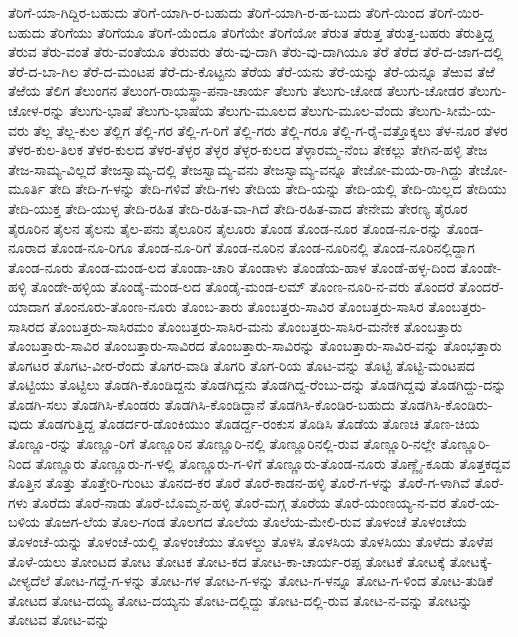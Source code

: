 ತೆರಿಗೆ-ಯಾ-ಗಿದ್ದಿರ-ಬಹುದು
ತೆರಿಗೆ-ಯಾಗಿ-ರ-ಬಹುದು
ತೆರಿಗೆ-ಯಾಗಿ-ರ-ಹ-ಬುದು
ತೆರಿಗೆ-ಯಿಂದ
ತೆರಿಗೆ-ಯಿರ-ಬಹುದು
ತೆರಿಗೆಯು
ತೆರಿಗೆಯೂ
ತೆರಿಗೆ-ಯೆಂದೂ
ತೆರಿಗೆಯೇ
ತೆರಿಗೆಯೋ
ತೆರುತ
ತೆರುತ್ತ
ತೆರುತ್ತ-ಬಹರು
ತೆರುತ್ತಿದ್ದ
ತೆರುವ
ತೆರು-ವಂತೆ
ತೆರು-ವಂತೆಯೂ
ತೆರುವರು
ತೆರು-ವು-ದಾಗಿ
ತೆರು-ವು-ದಾಗಿಯೂ
ತೆರೆ
ತೆರೆದ
ತೆರೆ-ದ-ಜಾಗ-ದಲ್ಲಿ
ತೆರೆ-ದ-ಬಾ-ಗಿಲ
ತೆರೆ-ದ-ಮಂಟಪ
ತೆರೆ-ದು-ಕೊಟ್ಟನು
ತೆರೆಯ
ತೆರೆ-ಯನು
ತೆರೆ-ಯನ್ನು
ತೆರೆ-ಯನ್ನೂ
ತೆಱುವ
ತೆಱೆ
ತೆಱೆಯ
ತೆಲಿಗ
ತೆಲುಂಗನ
ತೆಲುಂಗ-ರಾಯಸ್ಥಾ-ಪನಾ-ಚಾರ್ಯ
ತೆಲುಗು
ತೆಲುಗು-ಚೋಡ
ತೆಲುಗು-ಚೋಡರ
ತೆಲುಗು-ಚೋಳ-ರನ್ನು
ತೆಲುಗು-ಭಾಷೆ
ತೆಲುಗು-ಭಾಷೆಯ
ತೆಲುಗು-ಮೂಲದ
ತೆಲುಗು-ಮೂಲ-ವೆಂದು
ತೆಲುಗು-ಸೀಮೆ-ಯ-ವರು
ತೆಲ್ಲ
ತೆಲ್ಲ-ಕುಲ
ತೆಲ್ಲಿಗ
ತೆಲ್ಲಿ-ಗರ
ತೆಲ್ಲಿ-ಗ-ರಿಗೆ
ತೆಲ್ಲಿ-ಗರು
ತೆಲ್ಲಿ-ಗರೂ
ತೆಲ್ಲಿ-ಗ-ರೈ-ವತ್ತೊಕ್ಕಲು
ತೆಳ-ನೂರ
ತೆಳರ
ತೆಳರ-ಕುಲ-ತಿಲಕ
ತೆಳರ-ಕುಲದ
ತೆಳರ-ತೆಳ್ಳರ
ತೆಳ್ಳರ
ತೆಳ್ಳರ-ಕುಲದ
ತೆಳ್ಳಾರಮ್ಮ-ನೆಂಬ
ತೇಕಲ್ಲು
ತೇಗಿನ-ಹಳ್ಳಿ
ತೇಜ
ತೇಜ-ಸಾಮ್ಯ-ವಿಲ್ಲದೆ
ತೇಜಸ್ವಾಮ್ಯ-ದಲ್ಲಿ
ತೇಜಸ್ವಾಮ್ಯ-ವನು
ತೇಜಸ್ವಾಮ್ಯ-ವನ್ನೂ
ತೇಜೋ-ಮಯ-ರಾ-ಗಿದ್ದು
ತೇಜೋ-ಮೂರ್ತಿ
ತೇದಿ
ತೇದಿ-ಗ-ಳನ್ನು
ತೇದಿ-ಗಳಿವೆ
ತೇದಿ-ಗಳು
ತೇದಿಯ
ತೇದಿ-ಯನ್ನು
ತೇದಿ-ಯಲ್ಲಿ
ತೇದಿ-ಯಿಲ್ಲದ
ತೇದಿಯು
ತೇದಿ-ಯುಕ್ತ
ತೇದಿ-ಯುಳ್ಳ
ತೇದಿ-ರಹಿತ
ತೇದಿ-ರಹಿತ-ವಾ-ಗಿದೆ
ತೇದಿ-ರಹಿತ-ವಾದ
ತೇನೇಮ
ತೇರಣ್ಯ
ತೈರೂರ
ತೈರೂರಿನ
ತೈಲನ
ತೈಲನು
ತೈಲ-ಪನು
ತೈಲೂರಿನ
ತೈಲೂರು
ತೊಂಡ
ತೊಂಡ-ನೂರ
ತೊಂಡ-ನೂ-ರನ್ನು
ತೊಂಡ-ನೂರಾದ
ತೊಂಡ-ನೂ-ರಿಗೂ
ತೊಂಡ-ನೂ-ರಿಗೆ
ತೊಂಡ-ನೂರಿನ
ತೊಂಡ-ನೂರಿನಲ್ಲಿ
ತೊಂಡ-ನೂರಿನಲ್ಲಿದ್ದಾಗ
ತೊಂಡ-ನೂರು
ತೊಂಡ-ಮಂಡ-ಲದ
ತೊಂಡಾ-ಚಾರಿ
ತೊಂಡಾಳು
ತೊಂಡೆಯ-ಹಾಳ
ತೊಂಡೆ-ಹಳ್ಳ-ದಿಂದ
ತೊಂಡೇ-ಹಳ್ಳಿ
ತೊಂಡೇ-ಹಳ್ಳಿಯ
ತೊಂಡೈ-ಮಂಡ-ಲದ
ತೊಂಡೈ-ಮಂಡ-ಲಮ್
ತೊಂಣ-ನೂರಿ-ನ-ವರು
ತೊಂದರೆ
ತೊಂದರೆ-ಯಾದಾಗ
ತೊಂನೂರು-ತೊಂಣ-ನೂರು
ತೊಂಬ-ತಾರು
ತೊಂಬತ್ತರು-ಸಾವಿರ
ತೊಂಬತ್ತರು-ಸಾಸಿರ
ತೊಂಬತ್ತರು-ಸಾಸಿರದ
ತೊಂಬತ್ತರು-ಸಾಸಿರಮಂ
ತೊಂಬತ್ತರು-ಸಾಸಿರ-ಮನು
ತೊಂಬತ್ತರು-ಸಾಸಿರ-ಮನೇಕ
ತೊಂಬತ್ತಾರು
ತೊಂಬತ್ತಾರು-ಸಾವಿರ
ತೊಂಬತ್ತಾರು-ಸಾವಿರದ
ತೊಂಬತ್ತಾರು-ಸಾವಿರನ್ನು
ತೊಂಬತ್ತಾರು-ಸಾವಿರ-ವನ್ನು
ತೊಂಭತ್ತಾರು
ತೊಗಟರ
ತೊಗಟ-ವೀರ-ರೆಂದು
ತೊಗರ-ವಾಡಿ
ತೊಗರಿ
ತೊಗ-ರಿಯ
ತೊಟ-ವನ್ನು
ತೊಟ್ಟಿ
ತೊಟ್ಟಿ-ಮಂಟಪದ
ತೊಟ್ಟಿಯು
ತೊಟ್ಟಿಲು
ತೊಡಗಿ-ಕೊಂಡಿದ್ದನು
ತೊಡಗಿದ್ದನು
ತೊಡಗಿದ್ದ-ರೆಂಬು-ದನ್ನು
ತೊಡಗಿದ್ದವು
ತೊಡಗಿದ್ದು-ದನ್ನು
ತೊಡಗಿ-ಸಲು
ತೊಡಗಿಸಿ-ಕೊಂಡರು
ತೊಡಗಿಸಿ-ಕೊಂಡಿದ್ದಾನೆ
ತೊಡಗಿಸಿ-ಕೊಂಡಿರ-ಬಹುದು
ತೊಡಗಿಸಿ-ಕೊಂಡಿರು-ವುದು
ತೊಡಗುತ್ತಿದ್ದ
ತೊಡರ್ದರ-ಡೊಂಕಿಯುಂ
ತೊಡರ್ದ್ದ-ರಂಕುಸ
ತೊಡಿಸಿ
ತೊಡೆಯ
ತೊಣಚಿ
ತೊಣ-ಚಿಯ
ತೊಣ್ಣೂ-ರನ್ನು
ತೊಣ್ಣೂ-ರಿಗೆ
ತೊಣ್ಣೂರಿನ
ತೊಣ್ಣೂರಿ-ನಲ್ಲಿ
ತೊಣ್ಣೂರಿನಲ್ಲಿ-ರುವ
ತೊಣ್ಣೂರಿ-ನಲ್ಲೇ
ತೊಣ್ಣೂರಿ-ನಿಂದ
ತೊಣ್ಣೂರು
ತೊಣ್ಣೂರು-ಗ-ಳಲ್ಲಿ
ತೊಣ್ಣೂರು-ಗ-ಳಿಗೆ
ತೊಣ್ಣೂರು-ತೊಂಡ-ನೂರು
ತೊಣ್ಣೈ-ಕೂಡು
ತೊತ್ತಕದ್ದವ
ತೊತ್ತಿನ
ತೊತ್ತು
ತೊತ್ತೇರಿ-ಗುಂಟು
ತೊನದ-ಕರ
ತೊರೆ
ತೊರೆ-ಕಾಡನ-ಹಳ್ಳಿ
ತೊರೆ-ಗ-ಳನ್ನು
ತೊರೆ-ಗ-ಳಾಗಿವೆ
ತೊರೆ-ಗಳು
ತೊರೆದು
ತೊರೆ-ನಾಡು
ತೊರೆ-ಬೊಮ್ಮನ-ಹಳ್ಳಿ
ತೊರೆ-ಮಗ್ಗ
ತೊರೆಯ
ತೊರೆ-ಯಂಣಯ್ಯ-ನ-ವರ
ತೊರೆ-ಯ-ಬಳಿಯ
ತೊಱಗ-ಲೆಯ
ತೊಲ-ಗಂಡ
ತೊಲಗದ
ತೊಲೆಯ
ತೊಲೆಯ-ಮೇಲಿ-ರುವ
ತೊಳಂಚೆ
ತೊಳಂಚೆಯ
ತೊಳಂಚೆ-ಯನ್ನು
ತೊಳಂಚೆ-ಯಲ್ಲಿ
ತೊಳಂಚೆಯು
ತೊಳಲ್ದು
ತೊಳಸಿ
ತೊಳಸಿಯ
ತೊಳಸಿಯು
ತೊಳೆದು
ತೊಳೆಪ
ತೊಳೆ-ಯಲು
ತೋಂಟದ
ತೋಟ
ತೋಟಕ
ತೋಟ-ಕದ
ತೋಟ-ಕಾ-ಚಾರ್ಯ-ರಪ್ಪ
ತೋಟಕೆ
ತೋಟಕ್ಕೆ
ತೋಟಕ್ಕೆ-ವೀಳ್ಯದೆಲೆ
ತೋಟ-ಗದ್ದೆ-ಗ-ಳನ್ನು
ತೋಟ-ಗಳ
ತೋಟ-ಗ-ಳನ್ನು
ತೋಟ-ಗ-ಳನ್ನೂ
ತೋಟ-ಗ-ಳಿಂದ
ತೋಟ-ತುಡಿಕೆ
ತೋಟದ
ತೋಟ-ದಯ್ಯ
ತೋಟ-ದಯ್ಯನು
ತೋಟ-ದಲ್ಲಿದ್ದು
ತೋಟ-ದಲ್ಲಿ-ರುವ
ತೋಟ-ನ-ವನ್ನು
ತೋಟನ್ನು
ತೋಟವ
ತೋಟ-ವನ್ನು
